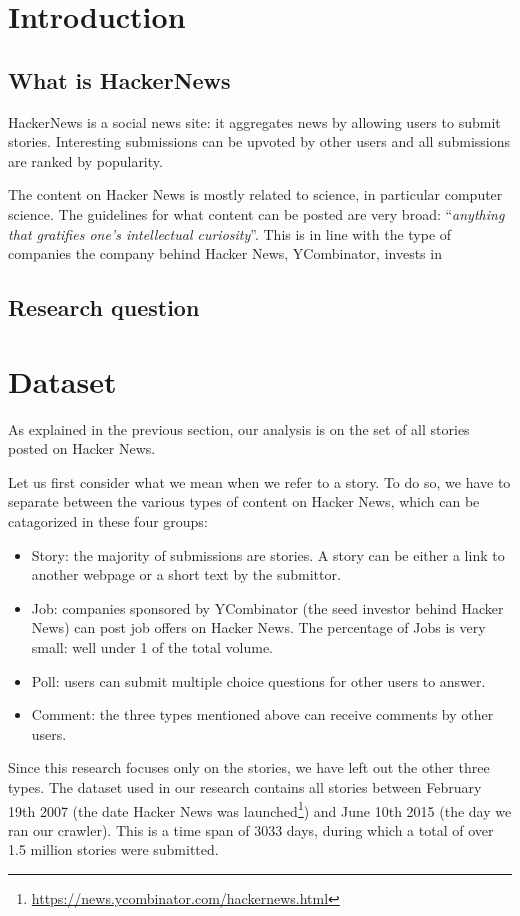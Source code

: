 \section{Introduction}
\subsection{What is HackerNews}
HackerNews is a social news site: it aggregates news by allowing users to submit stories. Interesting submissions can be upvoted by other users and all submissions are ranked by popularity.

The content on Hacker News is mostly related to science, in particular computer science. The guidelines for what content can be posted are very broad: ``\textit{anything that gratifies one's intellectual curiosity}''. This is in line with the type of companies the company behind Hacker News, YCombinator, invests in

\subsection{Research question}

\section{Dataset}
As explained in the previous section, our analysis is on the set of all stories posted on Hacker News. 

Let us first consider what we mean when we refer to a story. To do so, we have to separate between the various types of content on Hacker News, which can be catagorized in these four groups:
\begin{itemize}
\item Story: the majority of submissions are stories. A story can be either a link to another webpage or a short text by the submittor.
\item Job: companies sponsored by YCombinator (the seed investor behind Hacker News) can post job offers on Hacker News. The percentage of Jobs is very small: well under 1 of the total volume.
\item Poll: users can submit multiple choice questions for other users to answer.
\item Comment: the three types mentioned above can receive comments by other users.
\end{itemize}

Since this research focuses only on the stories, we have left out the other three types. The dataset used in our research contains all stories between February 19th 2007 (the date Hacker News was launched\footnote{\url{https://news.ycombinator.com/hackernews.html}}) and June 10th 2015 (the day we ran our crawler). This is a time span of 3033 days, during which a total of over 1.5 million stories were submitted.

